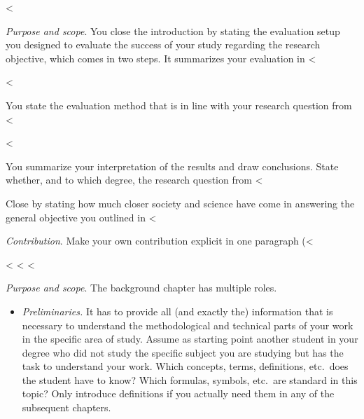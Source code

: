 {{{%
<%

\emph{Purpose and scope}.
You close the introduction by stating the evaluation setup you designed to evaluate the success of your study regarding the research objective, which comes in two steps.
It summarizes your evaluation in <%

<%

You state the evaluation method that is in line with your research question from <%

<%

You summarize your interpretation of the results and draw conclusions.
State whether, and to which degree, the research question from <%

Close by stating how much closer society and science have come in answering the general objective you outlined in <%

\emph{Contribution}.
Make your own contribution explicit in one paragraph (<%

<%
<%
<%

\emph{Purpose and scope}.
The background chapter has multiple roles.
\begin{itemize}

  \item \emph{Preliminaries.}
        It has to provide all (and exactly the) information that is necessary to understand the methodological and technical parts of your work in the specific area of study.
        Assume as starting point another student in your degree who did not study the specific subject you are studying but has the task to understand your work.
        Which concepts, terms, definitions, etc.\ does the student have to know?
        Which formulas, symbols, etc.\ are standard in this topic?
        Only introduce definitions if you actually need them in any of the subsequent chapters.


\end{itemize}}}}
